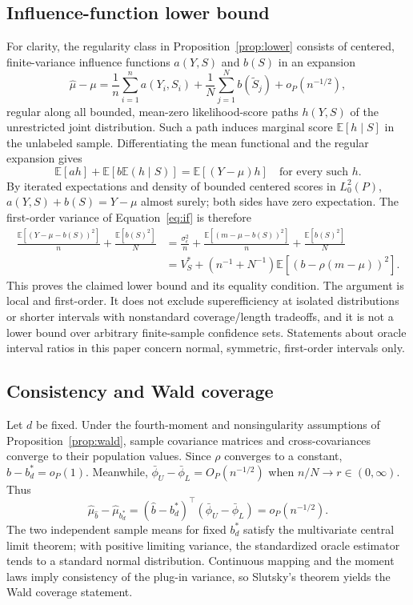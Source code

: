 \documentclass{article}
\newcommand{\E}{\mathbb E}
\begin{document}
\subsection{Influence-function lower bound}
For clarity, the regularity class in Proposition~\ref{prop:lower} consists of centered, finite-variance influence functions $a(Y,S)$ and $b(S)$ in an expansion
\begin{equation}
 \widehat\mu-\mu=\frac1n\sum_{i=1}^n a(Y_i,S_i)+\frac1N\sum_{j=1}^N b(\widetilde S_j)+o_P(n^{-1/2}),
 \label{eq:if}
\end{equation}
regular along all bounded, mean-zero likelihood-score paths $h(Y,S)$ of the unrestricted joint distribution. Such a path induces marginal score $\E[h\mid S]$ in the unlabeled sample. Differentiating the mean functional and the regular expansion gives
\begin{equation}
 \E[a h]+\E[b\E(h\mid S)]=\E[(Y-\mu)h]\quad\text{for every such }h.
 \label{eq:tangent}
\end{equation}
By iterated expectations and density of bounded centered scores in $L^2_0(P)$, $a(Y,S)+b(S)=Y-\mu$ almost surely; both sides have zero expectation. The first-order variance of Equation~\eqref{eq:if} is therefore
\begin{align}
 \frac{\E[(Y-\mu-b(S))^2]}n+\frac{\E[b(S)^2]}N
 &=\frac{\sigma_\epsilon^2}n+
   \frac{\E[(m-\mu-b(S))^2]}n+\frac{\E[b(S)^2]}N\\
 &=V_S^*+(n^{-1}+N^{-1})\E[(b-\rho(m-\mu))^2].
 \label{eq:ifbound}
\end{align}
This proves the claimed lower bound and its equality condition. The argument is local and first-order. It does not exclude superefficiency at isolated distributions or shorter intervals with nonstandard coverage/length tradeoffs, and it is not a lower bound over arbitrary finite-sample confidence sets. Statements about oracle interval ratios in this paper concern normal, symmetric, first-order intervals only.

\subsection{Consistency and Wald coverage}
Let $d$ be fixed. Under the fourth-moment and nonsingularity assumptions of Proposition~\ref{prop:wald}, sample covariance matrices and cross-covariances converge to their population values. Since $\rho$ converges to a constant, $\widehat b-b_d^*=o_P(1)$. Meanwhile, $\bar\phi_U-\bar\phi_L=O_P(n^{-1/2})$ when $n/N\to r\in(0,\infty)$. Thus
\begin{equation}
 \widehat\mu_{\widehat b}-\widehat\mu_{b_d^*}
 =(\widehat b-b_d^*)^\top(\bar\phi_U-\bar\phi_L)=o_P(n^{-1/2}).
 \label{eq:remainder}
\end{equation}
The two independent sample means for fixed $b_d^*$ satisfy the multivariate central limit theorem; with positive limiting variance, the standardized oracle estimator tends to a standard normal distribution. Continuous mapping and the moment laws imply consistency of the plug-in variance, so Slutsky's theorem yields the Wald coverage statement.
\end{document}

